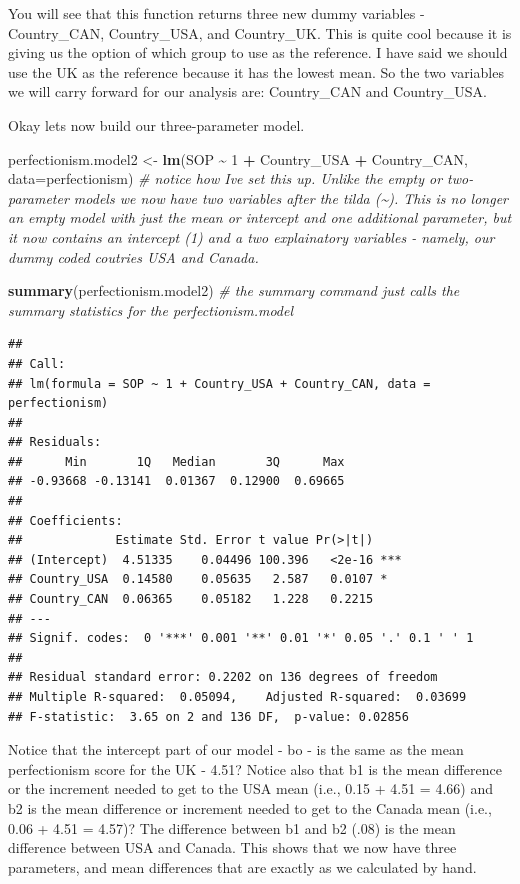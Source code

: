 \documentclass[
]{article}
\newenvironment{Shaded}{\begin{snugshade}}{\end{snugshade}}
\newcommand{\AttributeTok}[1]{\textcolor[rgb]{0.13,0.29,0.53}{#1}}
\newcommand{\CommentTok}[1]{\textcolor[rgb]{0.56,0.35,0.01}{\textit{#1}}}
\newcommand{\DecValTok}[1]{\textcolor[rgb]{0.00,0.00,0.81}{#1}}
\newcommand{\FunctionTok}[1]{\textcolor[rgb]{0.13,0.29,0.53}{\textbf{#1}}}
\newcommand{\NormalTok}[1]{#1}
\newcommand{\OtherTok}[1]{\textcolor[rgb]{0.56,0.35,0.01}{#1}}
\newcommand{\SpecialCharTok}[1]{\textcolor[rgb]{0.81,0.36,0.00}{\textbf{#1}}}
\begin{document}
You will see that this function returns three new dummy variables -
Country\_CAN, Country\_USA, and Country\_UK. This is quite cool because
it is giving us the option of which group to use as the reference. I
have said we should use the UK as the reference because it has the
lowest mean. So the two variables we will carry forward for our analysis
are: Country\_CAN and Country\_USA.

Okay lets now build our three-parameter model.

\begin{Shaded}
\begin{Highlighting}[]
\NormalTok{perfectionism.model2 }\OtherTok{\textless{}{-}} \FunctionTok{lm}\NormalTok{(SOP }\SpecialCharTok{\textasciitilde{}} \DecValTok{1} \SpecialCharTok{+}\NormalTok{ Country\_USA }\SpecialCharTok{+}\NormalTok{ Country\_CAN, }\AttributeTok{data=}\NormalTok{perfectionism) }\CommentTok{\# notice how I\textquotesingle{}ve set this up. Unlike the empty or two{-}parameter models we now have two variables after the tilda (\textasciitilde{}). This is no longer an empty model with just the mean or intercept and one additional parameter, but it now contains an intercept (1) and a two explainatory variables {-} namely, our dummy coded coutries USA and Canada.}

\FunctionTok{summary}\NormalTok{(perfectionism.model2) }\CommentTok{\# the summary command just calls the summary statistics for the perfectionism.model}
\end{Highlighting}
\end{Shaded}

\begin{verbatim}
## 
## Call:
## lm(formula = SOP ~ 1 + Country_USA + Country_CAN, data = perfectionism)
## 
## Residuals:
##      Min       1Q   Median       3Q      Max 
## -0.93668 -0.13141  0.01367  0.12900  0.69665 
## 
## Coefficients:
##             Estimate Std. Error t value Pr(>|t|)    
## (Intercept)  4.51335    0.04496 100.396   <2e-16 ***
## Country_USA  0.14580    0.05635   2.587   0.0107 *  
## Country_CAN  0.06365    0.05182   1.228   0.2215    
## ---
## Signif. codes:  0 '***' 0.001 '**' 0.01 '*' 0.05 '.' 0.1 ' ' 1
## 
## Residual standard error: 0.2202 on 136 degrees of freedom
## Multiple R-squared:  0.05094,    Adjusted R-squared:  0.03699 
## F-statistic:  3.65 on 2 and 136 DF,  p-value: 0.02856
\end{verbatim}

Notice that the intercept part of our model - bo - is the same as the
mean perfectionism score for the UK - 4.51? Notice also that b1 is the
mean difference or the increment needed to get to the USA mean (i.e.,
0.15 + 4.51 = 4.66) and b2 is the mean difference or increment needed to
get to the Canada mean (i.e., 0.06 + 4.51 = 4.57)? The difference
between b1 and b2 (.08) is the mean difference between USA and Canada.
This shows that we now have three parameters, and mean differences that
are exactly as we calculated by hand.
\end{document}
